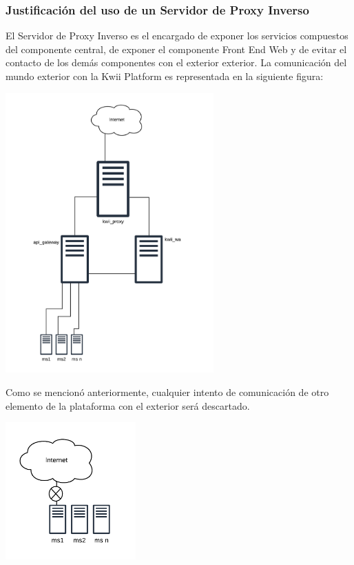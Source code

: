 \subsubsection{Justificación del uso de un Servidor de Proxy Inverso}
El Servidor de Proxy Inverso es el encargado de exponer los servicios compuestos del componente central, de exponer el componente Front End Web y de evitar el contacto de los demás componentes con el exterior exterior. La comunicación del mundo exterior con la Kwii Platform es representada en la siguiente figura:
\begin{center}
    \includegraphics[width=8cm]{Figures/P4/InverseProxyDiagram1.png}
\end{center}
Como se mencionó anteriormente, cualquier intento de comunicación de otro elemento de la plataforma con el exterior será descartado.
\begin{center}
    \includegraphics[width=5cm]{Figures/P4/InverseProxyDiagram2.png}
\end{center}

